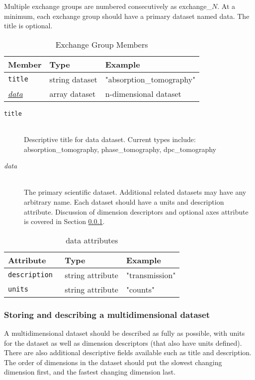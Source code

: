 Multiple exchange groups are numbered consecutively as exchange\_$N$. At a 
minimum, each exchange group should have a primary dataset named
data. The title is optional.

\begin{table}[h!]\sffamily \footnotesize
\centering
\caption{Exchange Group Members}
\begin{tabular}{l l l}
\toprule
\bfseries Member     & \bfseries Type & \bfseries Example \\
\midrule
\tt{title}  & string dataset & "absorption\_tomography" \\
\hyperref[data:attr]{\emph{data}}  &  array dataset & {n-dimensional dataset} \\
\bottomrule
\end{tabular}
\end{table}

\begin{description}
\item[\tt{title}] \hfill \\
{Descriptive title for data dataset. Current types include: absorption\_tomography, phase\_tomography, dpc\_tomography }

\item[\emph{data}] \hfill \\
{The primary scientific dataset. Additional related datasets may have any
arbitrary name. Each dataset should have a units and description attribute.
Discussion of dimension descriptors and optional axes attribute is covered
in Section \ref{sec:multidims}.}
\end{description}

\begin{table}[h!]\sffamily \footnotesize
\centering
\caption{data attributes}
\label{data:attr}
\begin{tabular}{l l l}
\toprule
\bfseries Attribute     & \bfseries Type & \bfseries Example \\
\midrule
\tt{description}  & string attribute & "transmission"  \\
\tt{units}  & string attribute & "counts"  \\
\bottomrule
\end{tabular}
\end{table}

\subsubsection{Storing and describing a multidimensional dataset}
\label{sec:multidims}
A multidimensional dataset should be described as fully as possible, with units for the dataset as well as 
dimension descriptors (that also have units defined). There are also additional descriptive fields available 
such as title and description. The order of dimensions in the dataset should put the slowest changing 
dimension first, and the fastest changing dimension last. 

